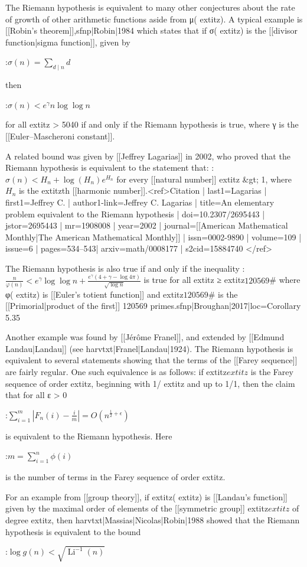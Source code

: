 \documentclass{article}
\begin{document}
The Riemann hypothesis is equivalent to many other conjectures about the rate of growth of other arithmetic functions aside from μ(	extit{z}). A typical example is [[Robin's theorem]],{{sfnp|Robin|1984}} which states that if σ(	extit{z}) is the [[divisor function|sigma function]], given by

:$\sigma(n) = \sum_{d\mid n} d$

then

:$\sigma(n) < e^\gamma n \log \log n$

for all 	extit{z} > 5040 if and only if the Riemann hypothesis is true, where γ is the [[Euler–Mascheroni constant]].

A related bound was given by [[Jeffrey Lagarias]] in 2002, who proved that the Riemann hypothesis is equivalent to the statement that:
:$ \sigma(n) < H_n + \log(H_n)e^{H_n}$
for every [[natural number]] 	extit{z} &gt; 1, where $H_n$ is the 	extit{z}th [[harmonic number]].<ref>{{Citation | last1=Lagarias | first1=Jeffrey C. | author1-link=Jeffrey C. Lagarias | title=An elementary problem equivalent to the Riemann hypothesis | doi=10.2307/2695443 | jstor=2695443 | mr=1908008 | year=2002 | journal=[[American Mathematical Monthly|The American Mathematical Monthly]] | issn=0002-9890 | volume=109 | issue=6 | pages=534–543| arxiv=math/0008177 | s2cid=15884740 }}</ref>

The Riemann hypothesis is also true if and only if the inequality
:$\frac{n}{\varphi (n)}<e^\gamma \log\log n+\frac{e^\gamma (4+\gamma-\log 4\pi)}{\sqrt{\log n}}$
is true for all 	extit{z} ≥ 	extit{z}$120569$# where φ(	extit{z}) is [[Euler's totient function]] and 	extit{z}$120569$# is the [[Primorial|product of the first]] 120569 primes.{{sfnp|Broughan|2017|loc=Corollary 5.35}}

Another example was found by [[Jérôme Franel]], and extended by [[Edmund Landau|Landau]] (see {{harvtxt|Franel|Landau|1924}}). The Riemann hypothesis is equivalent to several statements showing that the terms of the [[Farey sequence]] are fairly regular. One such equivalence is as follows: if 	extit{z}$	extit{z}$ is the Farey sequence of order 	extit{z}, beginning with 1/	extit{z} and up to 1/1, then the claim that for all ε > 0

:$\sum_{i=1}^m|F_n(i) - \tfrac{i}{m}| = O\left(n^{\frac{1}{2}+\epsilon}\right)$

is equivalent to the Riemann hypothesis. Here

:$m = \sum_{i=1}^n\phi(i)$

is the number of terms in the Farey sequence of order 	extit{z}.

For an example from [[group theory]], if 	extit{z}(	extit{z}) is [[Landau's function]] given by the maximal order of elements of the [[symmetric group]] 	extit{z}$	extit{z}$ of degree 	extit{z}, then {{harvtxt|Massias|Nicolas|Robin|1988}} showed that the Riemann hypothesis is equivalent to the bound

:$\log g(n) < \sqrt{\operatorname{Li}^{-1}(n)}$
\end{document}
